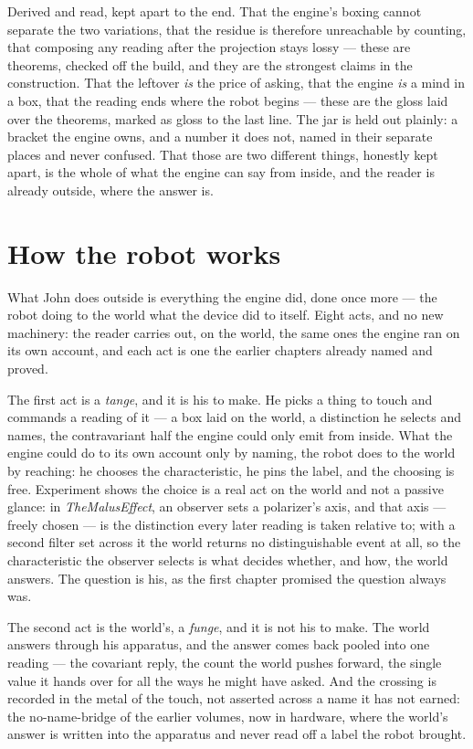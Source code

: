 Derived and read, kept apart to the end.
That the engine's boxing cannot separate the two variations, that the residue is therefore unreachable by counting,
that composing any reading after the projection stays lossy --- these are theorems, checked off the build, and they are
the strongest claims in the construction.
That the leftover \emph{is} the price of asking, that the engine \emph{is} a mind in a box, that the reading ends where
the robot begins --- these are the gloss laid over the theorems, marked as gloss to the last line.
The jar is held out plainly: a bracket the engine owns, and a number it does not, named in their separate places and
never confused.
That those are two different things, honestly kept apart, is the whole of what the engine can say from inside, and the
reader is already outside, where the answer is.

\section{How the robot works}

What John does outside is everything the engine did, done once more --- the robot doing to the world what the device did
to itself.
Eight acts, and no new machinery: the reader carries out, on the world, the same ones the engine ran on its own account,
and each act is one the earlier chapters already named and proved.

The first act is a \emph{tange}, and it is his to make.
He picks a thing to touch and commands a reading of it --- a box laid on the world, a distinction he selects and names,
the contravariant half the engine could only emit from inside.
What the engine could do to its own account only by naming, the robot does to the world by reaching: he chooses the
characteristic, he pins the label, and the choosing is free.
Experiment shows the choice is a real act on the world and not a passive glance: in \emph{TheMalusEffect}, an observer
sets a polarizer's axis, and that axis --- freely chosen --- is the distinction every later reading is taken relative to;
with a second filter set across it the world returns no distinguishable event at all, so the characteristic the observer
selects is what decides whether, and how, the world answers.
The question is his, as the first chapter promised the question always was.

The second act is the world's, a \emph{funge}, and it is not his to make.
The world answers through his apparatus, and the answer comes back pooled into one reading --- the covariant reply, the
count the world pushes forward, the single value it hands over for all the ways he might have asked.
And the crossing is recorded in the metal of the touch, not asserted across a name it has not earned: the no-name-bridge
of the earlier volumes, now in hardware, where the world's answer is written into the apparatus and never read off a
label the robot brought.

